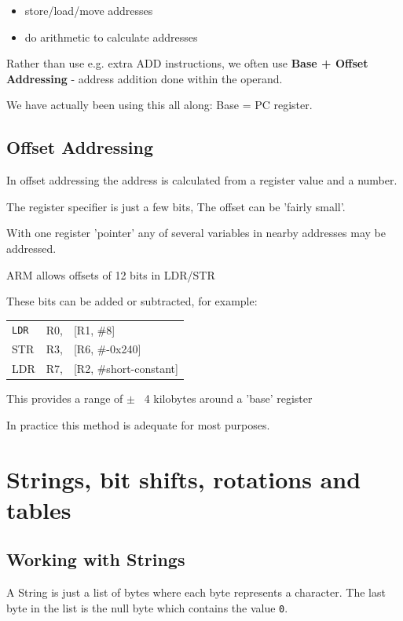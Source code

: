 \documentclass{article}
\begin{document}
\begin{itemize}
  \item store/load/move addresses
  \item do arithmetic to calculate addresses
\end{itemize}

Rather than use e.g. extra ADD instructions, we often use {\bf Base + Offset Addressing} - address addition done within the operand.

We have actually been using this all along: Base = PC register.

\subsection{Offset Addressing}
In offset addressing the address is calculated from a register value and a number.

The register specifier is just a few bits, The offset can be 'fairly small'.

With one register 'pointer' any of several variables in nearby addresses may be addressed.

ARM allows offsets of 12 bits in LDR/STR

These bits can be added or subtracted, for example:

\begin{center}
    \begin{tabular}{l l l}
        {\tt LDR} & R0, & [R1, \#8] \\
        STR & R3, & [R6, \#-0x240]\\
        LDR & R7, & [R2, \#short-constant]
    \end{tabular}
\end{center}

This provides a range of $\pm$ ~4 kilobytes around a 'base' register

In practice this method is adequate for most purposes. 

\section{Strings, bit shifts, rotations and tables}

\subsection{Working with Strings}

A String is just a list of bytes where each byte represents a character. The
last byte in the list is the null byte which contains the value {\tt 0}.
\end{document}
